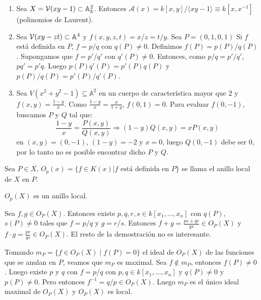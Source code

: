 \documentclass[ACGA.tex]{subfiles}
\begin{document}
\begin{ej}\mbox{}
\begin{enumerate}
	\item Sea $X=\mathcal{V}(xy-1) \subset \mathbb{A}^2_k$. Entonces $\mathcal{A}(x)=k[x,y]/\langle xy-1 \rangle \equiv k[x,x^{-1}]$ (polinomios de Laurent).

\item Sea $\mathcal{V}(xy-zt) \subset \mathbb{A}^4$ y $f(x,y,z,t)=x/z=t/y$. Sea $P=(0,1,0,1)$ Si $f$ está definida en $P$, $f=p/q$ con $q(P)\neq 0$. Definimos $f(P)=p(P)/q(P)$. Supongamos que $f=p'/q'$ con $q'(P) \neq 0$. Entonces, como $p/q = p'/q'$, $pq'=p'q$. Luego $p(P)q'(P)=p'(P)q(P)$ y $p(P)/q(P) = p'(P)/q'(P)$.

\item Sea $V(x^2+y^2-1) \subseteq \mathbb{A}^2$ en un cuerpo de característica mayor que $2$ y $f(x,y) = \frac{1-y}{x}$. Como $\frac{1-y}{x}=\frac{x}{1+y}$, $f(0,1)=0$. Para evaluar $f(0,-1)$, buscamos $P$ y $Q$ tal que:
\[ \frac{1-y}{x} = \frac{P(x,y)}{Q(x,y)} \Rightarrow (1-y)Q(x,y) = x P(x,y) \]
en $(x,y)=(0,-1)$, $(1-y)=-2$ y $x=0$, luego $Q(0,-1)$ debe ser $0$, por lo tanto no es posible encontrar dicho $P$ y $Q$.
\end{enumerate}
\end{ej}

\begin{defi}
Sea $P \in X$, $O_p(x)=\{f \in K(x) | f \text{ está definida en }P\}$ se llama el anillo local de $X$ en $P$.
\end{defi}

\begin{prop}
$O_p(X)$ es un anillo local.
\end{prop}

\begin{dem}
Sea $f,g \in O_P(X)$. Entonces existe $p,q,r,s \in k[x_1,\dots,x_n]$ con $q(P)$, $s(P) \neq 0$ tales que $f = p/q$ y $g=r/s$.
Entonces $f+g = \frac{ps+qr}{qs} \in O_P(X)$ y $f\cdot g = \frac{pr}{qs} \in O_P(X)$. El resto de la demostración no es interesante.

Tomando $m_P=\{f \in O_P(X) \mid f(P) = 0\}$ el ideal de $O_P(X)$ de las funciones que se anulan en $P$, veamos que $m_P$ es maximal. Sea $f \notin m_P$, entonces $f(P) \neq 0$. Luego existe $p$ y $q$ con $f=p/q$ con $p,q \in k[x_1,\dots,x_n]$ y $q(P)\neq 0$ y $p(P) \neq 0$. Pero entonces $f^{-1} = q/p \in O_P(X)$. Luego $m_P$ es el único ideal maximal de $O_P(X)$ y $O_P(X)$ es local.
\end{dem}
\end{document}
